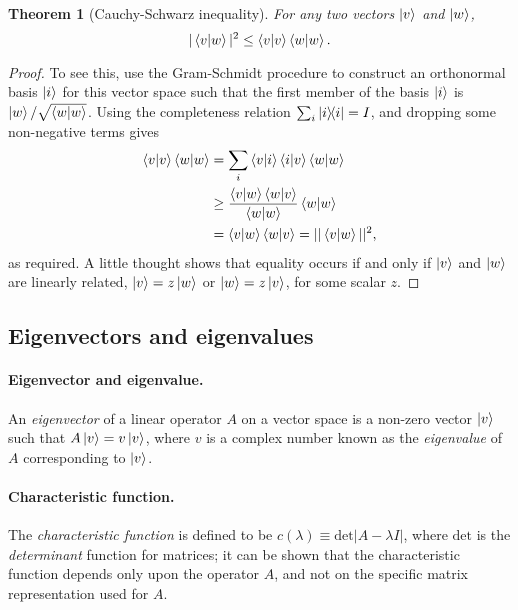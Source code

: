 \documentclass{article}
\newtheorem{theorem}{Theorem}
\begin{document}
\begin{theorem}[Cauchy-Schwarz inequality]
  For any two vectors $\ket{v}$ and $\ket{w}$, \begin{equation}
    |\braket{v}{w}|^2 \leq \braket{v}{v}\braket{w}{w}. \label{eq:cau-sch-ine}
  \end{equation}
\end{theorem}
\begin{proof}
  To see this, use the Gram-Schmidt procedure to construct an orthonormal basis
  $\ket{i}$ for this vector space such that the first member of the basis
  $\ket{i}$ is $\ket{w}/\sqrt{\braket{w}{w}}$. Using the completeness relation
  $\sum_i \ketbra{i}{i} = I$, and dropping some non-negative terms gives
  \begin{align*}
    \braket{v}{v}\braket{w}{w}
      &= \sum_i \braket{v}{i}\braket{i}{v} \braket{w}{w} \\
      &\geq \frac{\braket{v}{w}\braket{w}{v}}{\braket{w}{w}} \braket{w}{w} \\
      &= \braket{v}{w}\braket{w}{v} = ||\braket{v}{w}||^2,
  \end{align*} as required. A little thought shows that equality occurs if and
  only if $\ket{v}$ and $\ket{w}$ are linearly related, $\ket{v} = z\ket{w}$ or
  $\ket{w} = z\ket{v}$, for some scalar $z$.
\end{proof}

\subsection{Eigenvectors and eigenvalues}

\paragraph{Eigenvector and eigenvalue.} An \emph{eigenvector} of a linear
operator $A$ on a vector space is a non-zero vector $\ket{v}$ such that
$A\ket{v} = v\ket{v}$, where $v$ is a complex number known as the
\emph{eigenvalue} of $A$ corresponding to $\ket{v}$.

\paragraph{Characteristic function.} The \emph{characteristic function} is
defined to be $c(\lambda) \equiv \text{det} |A - \lambda I|$, where
$\text{det}$ is the \emph{determinant} function for matrices; it can be shown
that the characteristic function depends only upon the operator $A$, and not on
the specific matrix representation used for $A$.
\end{document}
